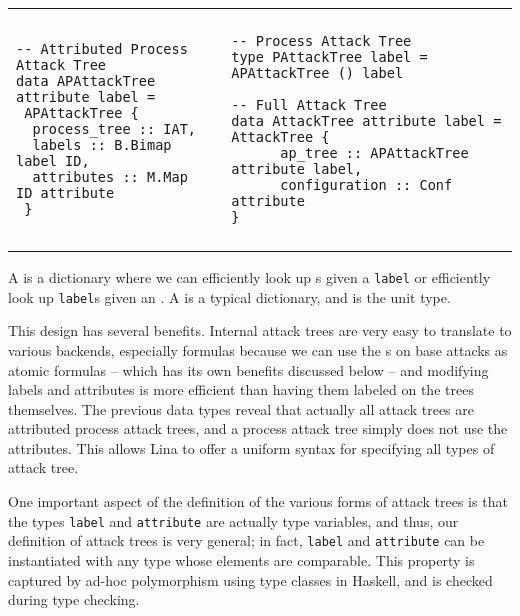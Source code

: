 \noindent \begin{tabular}{|l|ll|}
  \hline & & \\[-7px]
    \begin{minipage}{2in}        
    \begin{verbatim}
-- Attributed Process Attack Tree
data APAttackTree attribute label =
 APAttackTree {
  process_tree :: IAT,
  labels :: B.Bimap label ID,
  attributes :: M.Map ID attribute
 } 
    \end{verbatim}
    \vspace{-2px}
  \end{minipage}  
  & \quad &
    \begin{minipage}{2.4in}        
    \begin{verbatim}
-- Process Attack Tree
type PAttackTree label = APAttackTree () label

-- Full Attack Tree
data AttackTree attribute label = AttackTree {            
      ap_tree :: APAttackTree attribute label,
      configuration :: Conf attribute
}
    \end{verbatim}
    \end{minipage}\\
    & &\\    
    \hline
\end{tabular}

\noindent
A  is a dictionary where we can efficiently look up
s given a \verb!label! or efficiently look up \verb!label!s
given an . A  is a typical dictionary, and \mh{()} is
the unit type.

This design has several benefits. Internal attack trees are very easy
to translate to various backends, especially formulas because we can
use the s on base attacks as atomic formulas -- which has its
own benefits discussed below -- and modifying labels and attributes is
more efficient than having them labeled on the trees themselves.  The
previous data types reveal that actually all attack trees are
attributed process attack trees, and a process attack tree simply does
not use the attributes.  This allows Lina to offer a uniform syntax
for specifying all types of attack tree.

One important aspect of the definition of the various forms of attack
trees is that the types \verb!label! and \verb!attribute! are actually
type variables, and thus, our definition of attack trees is very
general; in fact, \verb!label! and \verb!attribute! can be
instantiated with any type whose elements are comparable.  This
property is captured by ad-hoc polymorphism using type classes in
Haskell, and is checked during type checking.


